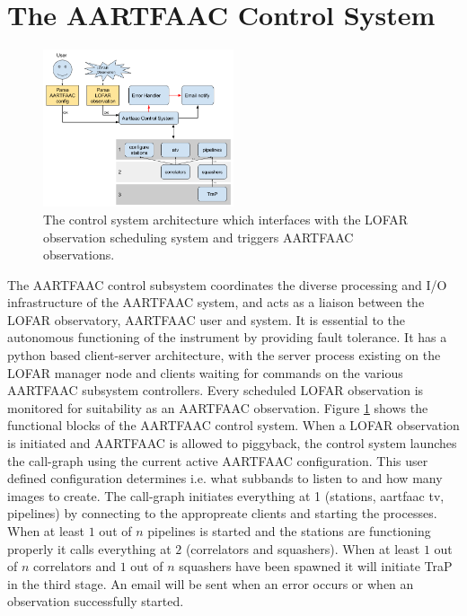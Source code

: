 \documentclass{ws-jai}
\begin{document}
\section {\label{sec:acontrol} The AARTFAAC Control System}
\begin{figure}[htbp]
\centering
\includegraphics[width=0.50\textwidth]{Figs/afaac_ctrl_system.png}
\caption{The  control  system  architecture  which  interfaces  with  the  LOFAR
  observation scheduling system and triggers AARTFAAC observations.}
\label{fig:afaac_ctrl_sys}
\end{figure}
The  AARTFAAC  control subsystem  coordinates  the  diverse processing  and
I/O infrastructure of the  AARTFAAC system, and acts as a  liaison between the
LOFAR observatory,  AARTFAAC user  and  system.   It is  essential  to the
autonomous functioning of  the instrument by  providing fault  tolerance.  It
has  a python based client-server architecture, with the  server process
existing on the LOFAR manager node and clients waiting for  commands on the
various AARTFAAC subsystem controllers. Every scheduled  LOFAR observation is
monitored  for suitability as an AARTFAAC  observation. Figure
\ref{fig:afaac_ctrl_sys} shows  the functional blocks of  the AARTFAAC control
system.   When a LOFAR observation is  initiated and AARTFAAC is allowed to
piggyback, the control  system launches  the  call-graph using  the  current
active  AARTFAAC configuration.  This  user defined configuration determines
i.e. what subbands to  listen to and how many  images to  create.  The
call-graph initiates  everything at  1 (stations, aartfaac tv,  pipelines) by
connecting to the appropreate clients and starting the processes. When at least
$1$ out of $n$ pipelines is started  and the stations are functioning properly
it calls everything at  $2$ (correlators and squashers). When at least $1$ out
of $n$ correlators and $1$ out of $n$ squashers have been spawned it will
initiate TraP in the third stage. An  email will be sent when an error occurs
or when an observation successfully started.\\
\end{document}
